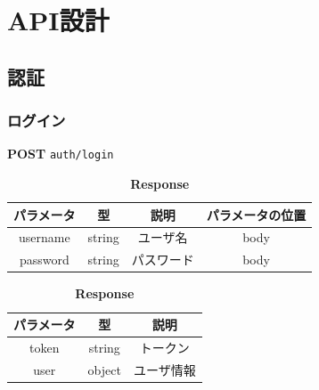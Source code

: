 \section{API設計}\label{sec:api}
\subsection{認証}
\subsubsection*{ログイン}
\textbf{POST} \texttt{auth/login}
\begin{table}[H]
  \begin{minipage}
    {0.5\hsize} \centering
    \captionsetup{labelformat=empty,labelsep=none}
    \caption{\textbf{Request}}
    \begin{tabular}{|c|c|c|c|} \hline
      パラメータ    & 型      & 説明    & パラメータの位置 \\ \hline \hline
      username & string & ユーザ名  & body     \\ \hline
      password & string & パスワード & body     \\ \hline
    \end{tabular}
  \end{minipage}
  \begin{minipage}
    {0.5\hsize} \centering
    \captionsetup{labelformat=empty,labelsep=none}
    \caption{\textbf{Response}}
    \begin{tabular}{|c|c|c|} \hline
      パラメータ & 型      & 説明    \\ \hline \hline
      token & string & トークン  \\ \hline
      user  & object & ユーザ情報 \\ \hline
    \end{tabular}
  \end{minipage}
\end{table}

